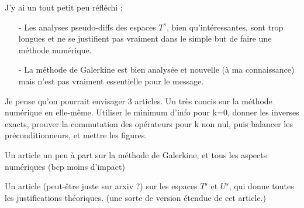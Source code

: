 \documentclass[a4paper]{article}
\begin{document}
J'y ai un tout petit peu réfléchi : 
\begin{itemize}
	\item[-] Les analyses pseudo-diffs des espaces $T^s$, bien qu'intéressantes, sont trop longues et ne se justifient pas vraiment dans le simple but de faire une méthode numérique. 
	\item[-] La méthode de Galerkine est bien analysée et nouvelle (à ma connaissance) mais n'est pas vraiment essentielle pour le message. 
\end{itemize}
Je pense qu'on pourrait envisager 3 articles. 
Un très concis sur la méthode numérique en elle-même. Utiliser le minimum d'info pour k=0, donner les inverses exacts, prouver la commutation des opérateurs pour k non nul, puis balancer les préconditionneurs, et mettre les figures. 

Un article un peu à part sur la méthode de Galerkine, et tous les aspects numériques (bcp moins d'impact)

Un article (peut-être juste sur arxiv ?) sur les espaces $T^s$ et $U^s$, qui donne toutes les justifications théoriques. (une sorte de version étendue de cet article.)
\end{document}

